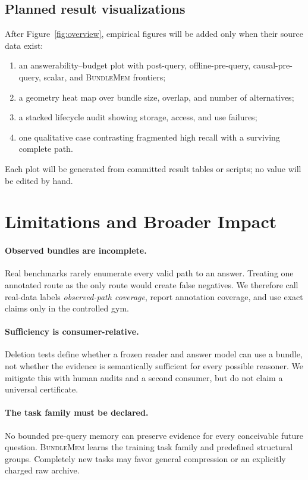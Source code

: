 \documentclass[10pt,twocolumn,letterpaper]{article}
\newcommand{\method}{\textnormal{\textsc{BundleMem}}\xspace}
\begin{document}
\subsection{Planned result visualizations}

After Figure~\ref{fig:overview}, empirical figures will be added only when their source data exist:
\begin{enumerate}[leftmargin=*,itemsep=1pt]
    \item an answerability--budget plot with post-query, offline-pre-query, causal-pre-query, scalar, and \method frontiers;
    \item a geometry heat map over bundle size, overlap, and number of alternatives;
    \item a stacked lifecycle audit showing storage, access, and use failures;
    \item one qualitative case contrasting fragmented high recall with a surviving complete path.
\end{enumerate}
Each plot will be generated from committed result tables or scripts; no value will be edited by hand.

\section{Limitations and Broader Impact}
\label{sec:limitations}

\paragraph{Observed bundles are incomplete.}
Real benchmarks rarely enumerate every valid path to an answer.
Treating one annotated route as the only route would create false negatives.
We therefore call real-data labels \emph{observed-path coverage}, report annotation coverage, and use exact claims only in the controlled gym.

\paragraph{Sufficiency is consumer-relative.}
Deletion tests define whether a frozen reader and answer model can use a bundle, not whether the evidence is semantically sufficient for every possible reasoner.
We mitigate this with human audits and a second consumer, but do not claim a universal certificate.

\paragraph{The task family must be declared.}
No bounded pre-query memory can preserve evidence for every conceivable future question.
\method learns the training task family and predefined structural groups.
Completely new tasks may favor general compression or an explicitly charged raw archive.
\end{document}
